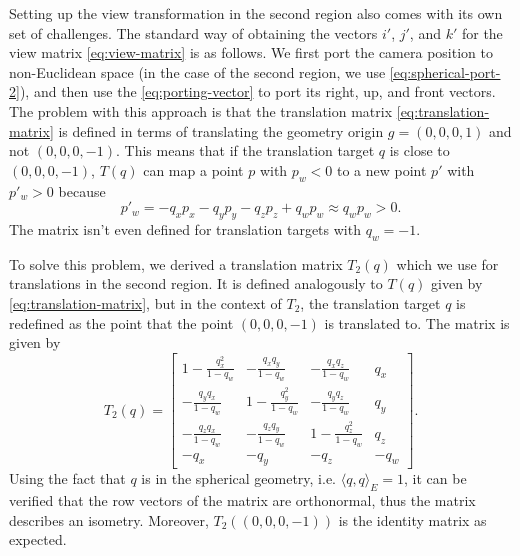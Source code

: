 Setting up the view transformation in the second region also comes with its own set of challenges.
The standard way of obtaining the vectors $i'$, $j'$, and $k'$ for the view matrix \ref{eq:view-matrix} is as follows.
We first port the camera position to non-Euclidean space (in the case of the second region, we use \autoref{eq:spherical-port-2}), and then use the \autoref{eq:porting-vector} to port its right, up, and front vectors.
The problem with this approach is that the translation matrix \ref{eq:translation-matrix} is defined in terms of translating the geometry origin $g = (0, 0, 0, 1)$ and not $(0, 0, 0, -1)$.
This means that if the translation target $q$ is close to $(0, 0, 0, -1)$, $T(q)$ can map a point $p$ with $p_w < 0$ to a new point $p'$ with $p'_w > 0$ because
\begin{equation*}
    p'_w = -q_x p_x - q_y p_y - q_z p_z + q_w p_w \approx q_w p_w > 0.
\end{equation*}
The matrix isn't even defined for translation targets with $q_w = -1$.

To solve this problem, we derived a translation matrix $T_2(q)$ which we use for translations in the second region.
It is defined analogously to $T(q)$ given by \autoref{eq:translation-matrix}, but in the context of $T_2$, the translation target $q$ is redefined as the point that the point $(0, 0, 0, -1)$ is translated to.
The matrix is given by
\begin{equation} \label{eq:translation-matrix-2}
    T_2(q) = \begin{bmatrix}
        1 - \frac{q_x^2}{1 - q_w} & -\frac{q_x q_y}{1 - q_w}  & -\frac{q_x q_z}{1 - q_w}  & q_x  \\
        -\frac{q_y q_x}{1 - q_w}  & 1 - \frac{q_y^2}{1 - q_w} & -\frac{q_y q_z}{1 - q_w}  & q_y  \\
        -\frac{q_z q_x}{1 - q_w}  & -\frac{q_z q_y}{1 - q_w}  & 1 - \frac{q_z^2}{1 - q_w} & q_z  \\
        -q_x                      & -q_y                      & -q_z                      & -q_w
    \end{bmatrix}.
\end{equation}
Using the fact that $q$ is in the spherical geometry, i.e. $\langle q, q \rangle_E = 1$, it can be verified that the row vectors of the matrix are orthonormal, thus the matrix describes an isometry.
Moreover, $T_2((0, 0, 0, -1))$ is the identity matrix as expected.
